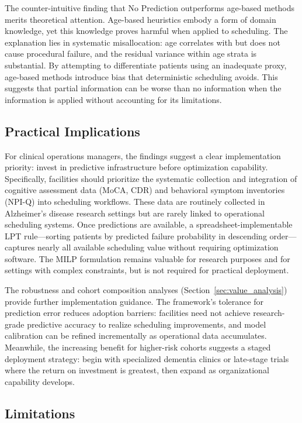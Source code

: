 \documentclass[11pt,a4paper]{article}
\begin{document}
The counter-intuitive finding that No Prediction outperforms age-based methods merits theoretical attention. Age-based heuristics embody a form of domain knowledge, yet this knowledge proves harmful when applied to scheduling. The explanation lies in systematic misallocation: age correlates with but does not cause procedural failure, and the residual variance within age strata is substantial. By attempting to differentiate patients using an inadequate proxy, age-based methods introduce bias that deterministic scheduling avoids. This suggests that partial information can be worse than no information when the information is applied without accounting for its limitations.

\subsection{Practical Implications}

For clinical operations managers, the findings suggest a clear implementation priority: invest in predictive infrastructure before optimization capability. Specifically, facilities should prioritize the systematic collection and integration of cognitive assessment data (MoCA, CDR) and behavioral symptom inventories (NPI-Q) into scheduling workflows. These data are routinely collected in Alzheimer's disease research settings but are rarely linked to operational scheduling systems. Once predictions are available, a spreadsheet-implementable LPT rule---sorting patients by predicted failure probability in descending order---captures nearly all available scheduling value without requiring optimization software. The MILP formulation remains valuable for research purposes and for settings with complex constraints, but is not required for practical deployment.

The robustness and cohort composition analyses (Section~\ref{sec:value_analysis}) provide further implementation guidance. The framework's tolerance for prediction error reduces adoption barriers: facilities need not achieve research-grade predictive accuracy to realize scheduling improvements, and model calibration can be refined incrementally as operational data accumulates. Meanwhile, the increasing benefit for higher-risk cohorts suggests a staged deployment strategy: begin with specialized dementia clinics or late-stage trials where the return on investment is greatest, then expand as organizational capability develops.

\subsection{Limitations}
\end{document}
